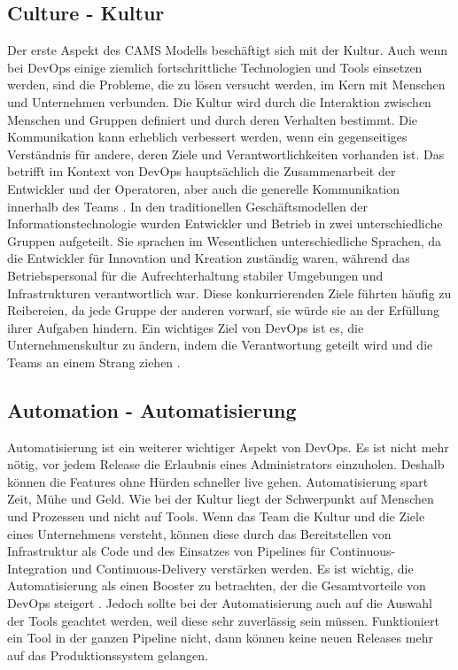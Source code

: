 \subsection{Culture - Kultur}
Der erste Aspekt des CAMS Modells beschäftigt sich mit der Kultur. Auch wenn bei DevOps einige ziemlich fortschrittliche Technologien und Tools einsetzen werden, sind die Probleme, die zu lösen versucht werden, im Kern mit Menschen und Unternehmen verbunden. Die Kultur wird durch die Interaktion zwischen Menschen und Gruppen definiert und durch deren Verhalten bestimmt. Die Kommunikation kann erheblich verbessert werden, wenn ein gegenseitiges Verständnis für andere, deren Ziele und Verantwortlichkeiten vorhanden ist. Das betrifft im Kontext von DevOps hauptsächlich die Zusammenarbeit der Entwickler und der Operatoren, aber auch die generelle Kommunikation innerhalb des Teams \cite{aljundi2018tools, perera2017improve}. In den traditionellen Geschäftsmodellen der Informationstechnologie wurden Entwickler und Betrieb in zwei unterschiedliche Gruppen aufgeteilt. Sie sprachen im Wesentlichen unterschiedliche Sprachen, da die Entwickler für Innovation und Kreation zuständig waren, während das Betriebspersonal für die Aufrechterhaltung stabiler Umgebungen und Infrastrukturen verantwortlich war. Diese konkurrierenden Ziele führten häufig zu Reibereien, da jede Gruppe der anderen vorwarf, sie würde sie an der Erfüllung ihrer Aufgaben hindern. Ein wichtiges Ziel von DevOps ist es, die Unternehmenskultur zu ändern, indem die Verantwortung geteilt wird und die Teams an einem Strang ziehen \cite{perera2017improve}.

\subsection{Automation - Automatisierung}
Automatisierung ist ein weiterer wichtiger Aspekt von DevOps. Es ist nicht mehr nötig, vor jedem Release die Erlaubnis eines Administrators einzuholen. Deshalb können die Features ohne Hürden schneller live gehen. Automatisierung spart Zeit, Mühe und Geld. Wie bei der Kultur liegt der Schwerpunkt auf Menschen und Prozessen und nicht auf Tools. Wenn das Team die Kultur und die Ziele eines Unternehmens versteht, können diese durch das Bereitstellen von Infrastruktur als Code und des Einsatzes von Pipelines für Continuous-Integration und Continuous-Delivery verstärken werden. Es ist wichtig, die Automatisierung als einen Booster zu betrachten, der die Gesamtvorteile von DevOps steigert \cite{mohammad2018improve}. Jedoch sollte bei der Automatisierung auch auf die Auswahl der Tools geachtet werden, weil diese sehr zuverlässig sein müssen. Funktioniert ein Tool in der ganzen Pipeline nicht, dann können keine neuen Releases mehr auf das Produktionssystem gelangen.

